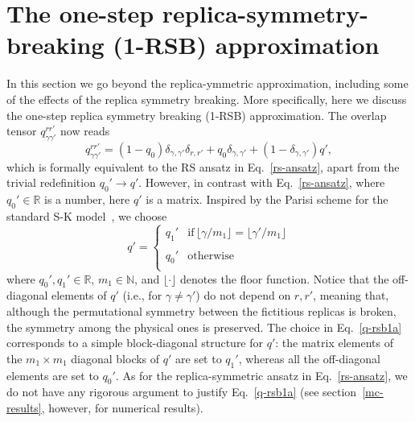 \documentclass[twocolumn,superscriptaddress,prb,10pt]{revtex4-1}
\begin{document}
\section{The one-step replica-symmetry-breaking (1-RSB) approximation}
\label{rsb-1-section}

In this section we go beyond the replica-ymmetric approximation, including some 
of the effects of the replica symmetry breaking. More specifically, 
here we discuss the one-step replica symmetry breaking (1-RSB) approximation. 
The overlap tensor $q_{\gamma\gamma'}^{rr'}$ now reads  
%
\begin{equation}
\label{q-rsb1}
q_{\gamma\gamma'}^{rr'}=(1-q_0)\delta_{\gamma,\gamma'}\delta_{r,r'} +
q_0\delta_{\gamma,\gamma'}+(1-\delta_{\gamma,\gamma'})q', 
\end{equation}
%
which is formally equivalent to the RS ansatz in Eq.~\eqref{rs-ansatz}, apart from 
the trivial redefinition $q_0'\to q'$. However, in contrast with Eq.~\eqref{rs-ansatz}, 
where $q_0'\in\mathbb{R}$ is a number, here $q'$ is a matrix. Inspired by the Parisi 
scheme for the standard S-K model~\cite{parisi-1979}, we choose 
%
\begin{equation}
q'=\left\{
\begin{array}{cc}
q_1' & \textrm{if}\, \lfloor\gamma/m_1\rfloor=\lfloor\gamma'/m_1\rfloor\\\\
q_0' & \textrm{otherwise}\\
\end{array}
\right.
\label{q-rsb1a}
\end{equation}
%
where $q_0',q_1'\in{\mathbb R}$, $m_1\in{\mathbb N}$, and $\lfloor\cdot\rfloor$ 
denotes the floor function. Notice that the off-diagonal elements of $q'$ (i.e., for 
$\gamma\ne\gamma'$) do not depend on $r,r'$, meaning that, although the permutational 
symmetry between the fictitious replicas is broken, the symmetry among the physical ones 
is preserved. The choice in Eq.~\eqref{q-rsb1a} corresponds to a simple block-diagonal 
structure for $q'$: the matrix elements of the $m_1\times m_1$ diagonal blocks of $q'$ 
are set to $q_1'$, whereas all the off-diagonal elements are set to $q_0'$. As for the 
replica-symmetric ansatz in Eq.~\eqref{rs-ansatz}, we do not have any rigorous argument 
to justify Eq.~\eqref{q-rsb1a} (see section~\eqref{mc-results}, however, for numerical 
results).
\end{document}
